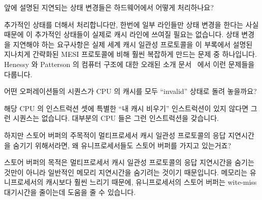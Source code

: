 \begin{enumerate}
\QuickQ{}
	앞에 설명된 지연되는 상태 변경들은 하드웨어에서 어떻게 처리하나요?

\QuickA{}
	추가적인 상태를 더해서 처리합니다만, 한번에 일부 라인들만 상태 변경을
	한다는 사실 때문에 이 추가적인 상태들이 실제로 캐시 라인에 쓰여질
	필요는 없습니다.
	상태 변경을 지연해야 하는 요구사항은 실제 세계 캐시 일관성 프로토콜을
	이 부록에서 설명된 지나치게 간략화된 MESI 프로토콜에 비해 훨씬 복잡하게
	만드는 문제 중 하나입니다.
	Henessy 와 Patterson 의 컴퓨터 구조에 대한 오래된 소개
	문서~\cite{Hennessy95a} 에서 이런 문제들을 다룹니다.

\QuickQ{}
	어떤 오퍼레이션들의 시퀀스가 CPU 의 캐시를 모두 ``invalid'' 상태로 돌려
	놓을까요?

\QuickA{}
	해당 CPU 의 인스트럭션 셋에 특별한 ``내 캐시 비우기'' 인스트럭션이 있지
	않다면 그런 시퀀스는 없습니다.
	대부분의 CPU 들은 그런 인스트럭션을 갖습니다.

\QuickQ{}
	하지만 스토어 버퍼의 주목적이 멀티프로세서 캐시 일관성 프로토콜의 응답
	지연시간을 숨기기 위해서라면, 왜 유니프로세서들도 스토어 버퍼를 가지고
	있는거죠?

\QuickA{}
	스토어 버퍼의 목적은 멀티프로세서 캐시 일관성 프로토콜의 응답
	지연시간을 숨기는 것만이 아니라 일반적인 메모리 지연시간을 숨기려는
	것이기 때문입니다.
	메모리는 유니프로세서의 캐시보다 훨씬 느리기 때문에, 유니프로세서의
	스토어 버퍼는 wite-miss 대기시간을 줄이는데 도움을 줄 수 있습니다.
	\iffalse


\end{enumerate}
